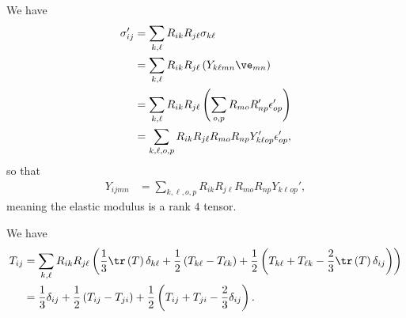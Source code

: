 \documentclass[10pt]{mypackage}
\begin{document}
\begin{solution}[29.14]
  We have
  \begin{align*}
    \sigma_{ij}' &= \sum_{k,\ell}R_{ik}R_{j\ell}\sigma_{k\ell}\\
                 &= \sum_{k,\ell} R_{ik}R_{j\ell}\left( Y_{k\ell mn}\ve_{mn} \right)\\
                 &= \sum_{k,\ell}R_{ik}R_{j\ell}\left( \sum_{o,p}R_{mo}R_{np}'\epsilon_{op}' \right)\\
                 &= \sum_{k,\ell,o,p}R_{ik}R_{j\ell}R_{mo}R_{np} Y_{k\ell o p}'\epsilon_{op}',
  \end{align*}
  so that
  \begin{align*}
    Y_{ijmn} &= \sum_{k,\ell,o,p}R_{ik}R_{j\ell}R_{mo}R_{np}Y_{k\ell op}',
  \end{align*}
  meaning the elastic modulus is a rank $4$ tensor.
\end{solution}
\begin{solution}[29.23]
  We have
  \begin{align*}
    T_{ij} &= \sum_{k,\ell}R_{i k}R_{j\ell}\left( \frac{1}{3}\tr\left( T \right)\delta_{k \ell} + \frac{1}{2}\left( T_{k \ell} - T_{\ell k}  \right) + \frac{1}{2}\left( T_{k\ell} + T_{\ell k} - \frac{2}{3}\tr\left( T \right)\delta_{ij} \right) \right)\\
           &= \frac{1}{3}\delta_{ij} + \frac{1}{2}\left( T_{ij} - T_{ji} \right) + \frac{1}{2}\left( T_{ij} + T_{ji} - \frac{2}{3}\delta_{ij} \right).
  \end{align*}
\end{solution}
\begin{solution}[29.24]

\end{solution}
\begin{solution}[29.25]

\end{solution}
\end{document}
